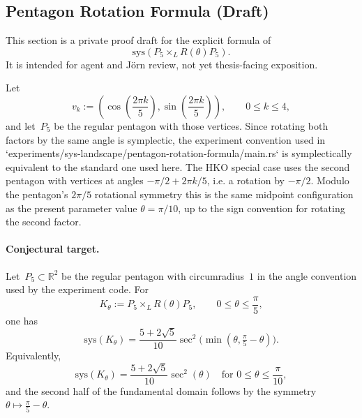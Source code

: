 %
%
%

\subsection{Pentagon Rotation Formula (Draft)}
\label{sec:pentagon-rotation-formula}

This section is a private proof draft for the explicit formula of
\[
  \mathrm{sys}\!\left(P_5 \times_L R(\theta) P_5\right).
\]
It is intended for agent and Jörn review, not yet thesis-facing exposition.

Let
\[
  v_k := \left(
    \cos\left(\frac{2\pi k}{5}\right),
    \sin\left(\frac{2\pi k}{5}\right)
  \right),
  \qquad 0 \le k \le 4,
\]
and let~$P_5$ be the regular pentagon with those vertices. Since rotating both
factors by the same angle is symplectic, the experiment convention used in
`experiments/sys-landscape/pentagon-rotation-formula/main.rs` is symplectically
equivalent to the standard one used here. The HKO special case uses the second
pentagon with vertices at angles $-\pi/2 + 2\pi k/5$, i.e. a rotation by
$-\pi/2$. Modulo the pentagon's $2\pi/5$ rotational symmetry this is the same
midpoint configuration as the present parameter value $\theta=\pi/10$, up to
the sign convention for rotating the second factor.

\begin{unverified}
\paragraph{Conjectural target.}
Let~$P_5 \subset \mathbb{R}^2$ be the regular pentagon with circumradius~$1$
in the angle convention used by the experiment code. For
\[
  K_\theta := P_5 \times_L R(\theta) P_5,
  \qquad 0 \le \theta \le \frac{\pi}{5},
\]
one has
\[
  \mathrm{sys}(K_\theta)
  =
  \frac{5 + 2\sqrt{5}}{10}
  \sec^2\!\bigl(\min(\theta, \tfrac{\pi}{5} - \theta)\bigr).
\]
Equivalently,
\[
  \mathrm{sys}(K_\theta)
  =
  \frac{5 + 2\sqrt{5}}{10}\sec^2(\theta)
  \quad \text{for } 0 \le \theta \le \frac{\pi}{10},
\]
and the second half of the fundamental domain follows by the symmetry
$\theta \mapsto \frac{\pi}{5} - \theta$.
\end{unverified}

